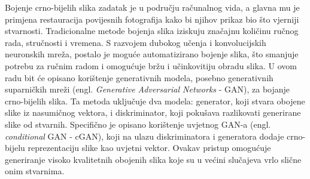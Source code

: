Bojenje crno-bijelih slika zadatak je u području računalnog vida, a glavna mu je primjena restauracija povijesnih fotografija kako bi njihov prikaz bio što vjerniji stvarnosti. Tradicionalne metode bojenja slika iziskuju značajnu količinu ručnog rada, stručnosti i vremena. S razvojem dubokog učenja i konvolucijskih neuronskih mreža, postalo je moguće automatizirano bojenje slika, što smanjuje potrebu za ručnim radom i omogućuje bržu i učinkovitiju obradu slika. U ovom radu bit će opisano korištenje generativnih modela, posebno generativnih suparničkih mreži (engl. \textit{Generative Adversarial Networks} - GAN), za bojanje crno-bijelih slika. Ta metoda uključuje dva modela: generator, koji stvara obojene slike iz nasumičnog vektora, i diskriminator, koji pokušava razlikovati generirane slike od stvarnih. Specifično je opisano korištenje uvjetnog GAN-a (engl. \textit{conditional} GAN - cGAN), koji na ulazu diskriminatora i generatora dodaje crno-bijelu reprezentaciju slike kao uvjetni vektor. Ovakav pristup omogućuje generiranje visoko kvalitetnih obojenih slika koje su u većini slučajeva vrlo slične onim stvarnima.